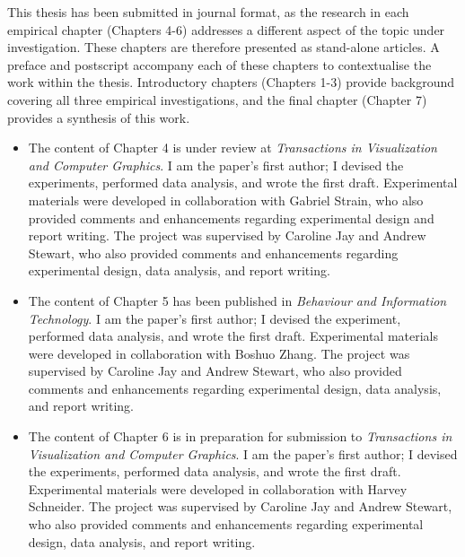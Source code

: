 This thesis has been submitted in journal format, as the research in each empirical chapter (Chapters 4-6) addresses a different aspect of the topic under investigation. These chapters are therefore presented as stand-alone articles. A preface and postscript accompany each of these chapters to contextualise the work within the thesis. Introductory chapters (Chapters 1-3) provide background covering all three empirical investigations, and the final chapter (Chapter 7) provides a synthesis of this work.

\begin{itemize} 
\item The content of Chapter 4 is under review at \textit{Transactions in Visualization and Computer Graphics}. I am the paper’s first author; I devised the experiments, performed data analysis, and wrote the first draft. Experimental materials were developed in collaboration with Gabriel Strain, who also provided comments and enhancements regarding experimental design and report writing. The project was supervised by Caroline Jay and Andrew Stewart, who also provided comments and enhancements regarding experimental design, data analysis, and report writing.
\item The content of Chapter 5 has been published in \textit{Behaviour and Information Technology}. I am the paper’s first author; I devised the experiment, performed data analysis, and wrote the first draft. Experimental materials were developed in collaboration with Boshuo Zhang. The project was supervised by Caroline Jay and Andrew Stewart, who also provided comments and enhancements regarding experimental design, data analysis, and report writing.
\item The content of Chapter 6 is in preparation for submission to \textit{Transactions in Visualization and Computer Graphics}. I am the paper’s first author; I devised the experiments, performed data analysis, and wrote the first draft. Experimental materials were developed in collaboration with Harvey Schneider. The project was supervised by Caroline Jay and Andrew Stewart, who also provided comments and enhancements regarding experimental design, data analysis, and report writing.\\
\end{itemize} 
